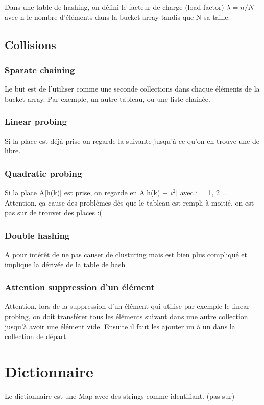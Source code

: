 \documentclass[a4paper]{article}
\begin{document}
Dans une table de hashing, on défini le facteur de charge (load factor) $\lambda = n/N$ avec n le nombre d'éléments dans la bucket array tandis que N sa taille.


\subsection{Collisions}
\subsubsection{Sparate chaining}
Le but est de l'utiliser comme une seconde collections dans chaque éléments de la bucket array. Par exemple, un autre tableau, ou une liste chainée.

\subsubsection{Linear probing}
Si la place est déjà prise on regarde la suivante jusqu'à ce qu'on en trouve une de libre.

\subsubsection{Quadratic probing}
Si la place A[h(k)] est prise, on regarde en A[h(k) + $i^2$] avec i = 1, 2 ...\\
Attention, ça cause des problèmes dès que le tableau est rempli à moitié, on est pas sur de trouver des places :(

\subsubsection{Double hashing}
A pour intérêt de ne pas causer de clusturing mais est bien plus compliqué et implique la dérivée de la table de hash


\subsubsection{Attention suppression d'un élément}
Attention, lors de la suppression d'un élément qui utilise par exemple le linear probing, on doit transférer tous les éléments suivant dans une autre collection jusqu'à avoir une élément vide. Ensuite il faut les ajouter un à un dans la collection de départ.


\section{Dictionnaire}
Le dictionnaire est une Map avec des strings comme identifiant. (pas sur)
\end{document}
